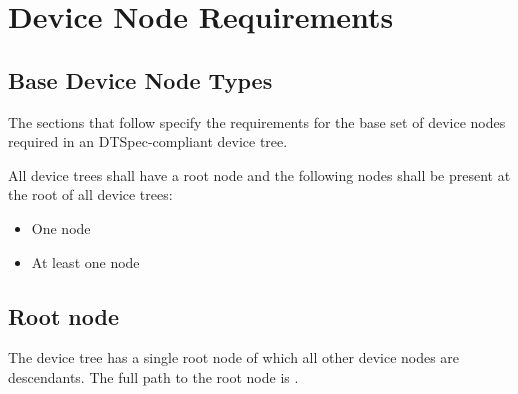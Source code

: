 \documentclass[a4paper,10pt,oneside]{sphinxmanual}
\begin{document}
\chapter{Device Node Requirements}
\label{devicenodes:chapter-device-node-requirements}\label{devicenodes:device-node-requirements}\label{devicenodes::doc}

\section{Base Device Node Types}
\label{devicenodes:base-device-node-types}
The sections that follow specify the requirements for the base set of
device nodes required in an DTSpec-compliant device tree.

All device trees shall have a root node and the following nodes shall be
present at the root of all device trees:
\begin{itemize}
\item {} 
One  node

\item {} 
At least one  node

\end{itemize}


\section{Root node}
\label{devicenodes:root-node}
The device tree has a single root node of which all other device nodes
are descendants. The full path to the root node is \code{/}.
\end{document}
